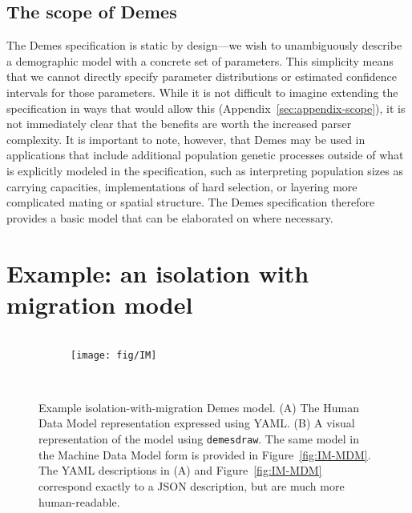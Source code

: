 \documentclass[11pt]{article}
\newcommand{\demesdraw}[0]{\texttt{demesdraw}}
\begin{document}
\subsection*{The scope of Demes}

The Demes specification is static by design---we wish to unambiguously
describe a demographic model with a concrete set of parameters.
This simplicity means that we cannot directly specify parameter distributions
or estimated confidence intervals for those parameters.
While it is not difficult to imagine extending the specification in ways that
would allow this (Appendix~\ref{sec:appendix-scope}), it is not immediately
clear that the benefits are worth the increased parser complexity.
It is important to note, however, that Demes may be used in applications that
include additional population genetic processes outside of what is explicitly
modeled in the specification, such as interpreting population sizes as
carrying capacities, implementations of hard selection, or layering more
complicated mating or spatial structure. The Demes specification therefore
provides a basic model that can be elaborated on where necessary.

\section*{Example: an isolation with migration model}

\begin{figure}[h!]
    \begin{minipage}{0.45\textwidth}
    \begin{subfigure}{\textwidth}
    \caption{}
        \begin{tcolorbox}[equal height group=IM]
            \inputminted[fontsize=\scriptsize,numbersep=5pt]{yaml}{models/IM.yaml}
        \end{tcolorbox}
    \end{subfigure}
    \end{minipage}\hfill%
%
    \begin{minipage}{0.50\textwidth}
    \begin{subfigure}{\textwidth}
    \caption{}
        \begin{tcolorbox}[equal height group=IM, boxsep=0pt]
            \texttt{[image: fig/IM]}
        \end{tcolorbox}
    \end{subfigure}
    \end{minipage}\\

    \caption{
        \label{fig:IM}
        Example isolation-with-migration Demes model. (A) The Human Data Model
        representation expressed using YAML.
        (B) A visual representation of the model using \demesdraw.
        The same model in the Machine Data Model form is provided in
        Figure~\ref{fig:IM-MDM}.
        The YAML descriptions in (A) and Figure~\ref{fig:IM-MDM} correspond
        exactly to a JSON description, but are much more human-readable.
    }
\end{figure}
\end{document}
